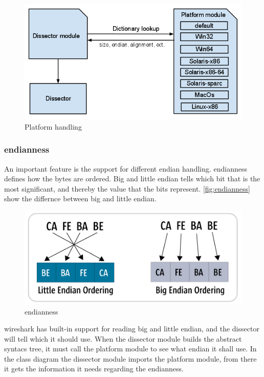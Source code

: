 \begin{figure}[!htb]
	\includegraphics[width=\textwidth]{./sprints/img/platformhandling}
	\caption{Platform handling\label{fig:platformhandling}}
\end{figure}

\subsubsection{\Gls{endianness}}
An important feature is the support for different \gls{endian} handling. \Gls{endianness} defines how the bytes are ordered. Big and little endian tells which bit that is the most significant, and thereby the value that the bits represent. \autoref{fig:endianness} show the differnce between big and little endian.
\begin{figure}[!htb]
	\includegraphics[width=\textwidth]{./sprints/img/endianness}
	\caption{\Gls{endianness}\cite{Endianness} \label{fig:endianness}}
\end{figure}
\Gls{wireshark} has built-in support for reading big and little \gls{endian}, and the dissector will tell which it should use. When the \gls{dissector} module builds the abstract syntacs tree, it must call the platform module to see what \gls{endian} it shall use. In the class diagram the \gls{dissector} module imports the platform module, from there it gets the information it needs regarding the \gls{endianness}. 

